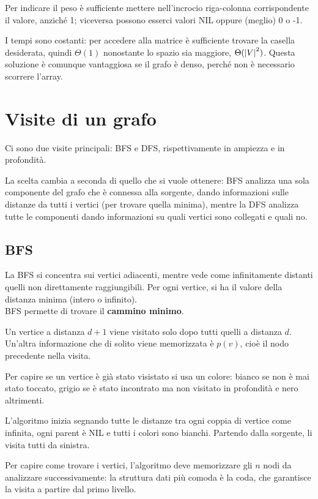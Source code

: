 Per indicare il peso è sufficiente mettere nell'incrocio riga-colonna corrispondente il valore, anziché 1; viceversa possono esserci valori NIL oppure (meglio) 0 o -1.

I tempi sono costanti: per accedere alla matrice è sufficiente trovare la casella desiderata, quindi $\Theta(1)$ nonostante lo spazio sia maggiore, $\Theta(\left|V\right|^2)$. Questa soluzione è comunque vantaggiosa se il grafo è denso, perché non è necessario scorrere l'array.

\newpage
\section{Visite di un grafo}
Ci sono due visite principali: BFS e DFS, rispettivamente in ampiezza e in profondità. 

La scelta cambia a seconda di quello che si vuole ottenere: BFS analizza una sola componente del grafo che è connessa alla sorgente, dando informazioni sulle distanze da tutti i vertici (per trovare quella minima), mentre la DFS analizza tutte le componenti dando informazioni su quali vertici sono collegati e quali no.

\subsection{BFS}
La BFS si concentra sui vertici adiacenti, mentre vede come infinitamente distanti quelli non direttamente raggiungibili. Per ogni vertice, si ha il valore della distanza minima (intero o infinito). \\ BFS permette di trovare il \textbf{cammino minimo}. 

Un vertice a distanza $d+1$ viene visitato solo dopo tutti quelli a distanza $d$. Un'altra informazione che di solito viene memorizzata è $p(v)$, cioè il nodo precedente nella visita.

Per capire se un vertice è già stato visistato si usa un colore: bianco se non è mai stato toccato, grigio se è stato incontrato ma non visitato in profondità e nero altrimenti.

L'algoritmo inizia segnando tutte le distanze tra ogni coppia di vertice come infinita, ogni parent è NIL e tutti i colori sono bianchi. Partendo dalla sorgente, li visita tutti da sinistra.

Per capire come trovare i vertici, l'algoritmo deve memorizzare gli $n$ nodi da analizzare successivamente: la struttura dati più comoda è la coda, che garantisce la visita a partire dal primo livello.

